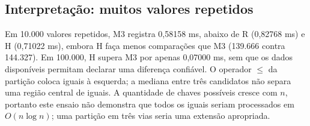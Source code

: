 \subsection*{Interpretação: muitos valores repetidos}
Em 10.000 valores repetidos, M3 registra 0,58158 ms, abaixo de R (0,82768 ms) e H (0,71022 ms), embora H faça menos comparações que M3 (139.666 contra 144.327). Em 100.000, H supera M3 por apenas 0,07000 ms, sem que os dados disponíveis permitam declarar uma diferença confiável. O operador $\leq$ da partição coloca iguais à esquerda; a mediana entre três candidatos não separa uma região central de iguais. A quantidade de chaves possíveis cresce com $n$, portanto este ensaio não demonstra que todos os iguais seriam processados em $O(n\log n)$; uma partição em três vias seria uma extensão apropriada.

